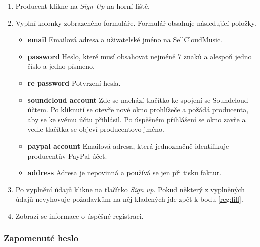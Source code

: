 \documentclass[12pt]{article}
\begin{document}
\begin{enumerate}

\item Producent klikne na \emph{Sign Up} na horní liště.
\item \label{reg:fill} Vyplní kolonky zobrazeného formuláře. Formulář obsahuje následující položky.

\begin{itemize}
\item{\textbf{email}} Emailová adresa a uživatelské jméno na SellCloudMusic.
\item{\textbf{password}} Heslo, které musí obsahovat nejméně 7 znaků a alespoň jedno číslo a jedno písmeno.
\item{\textbf{re password}} Potvrzení hesla.
\item{\textbf{soundcloud account}} Zde se nachází tlačítko ke spojení se Soundcloud účtem. Po kliknutí se otevře nové okno prohlížeče a požádá producenta, aby se ke svému účtu přihlásil. Po úspěšném přihlášení se okno zavře a vedle tlačítka se objeví producentovo jméno.
\item{\textbf{paypal account}} Emailová adresa, která jednoznačně identifikuje producentův PayPal účet.
\item{\textbf{address}} Adresa je nepovinná a používá se jen při tisku faktur.
\end{itemize}

\item Po vyplnění údajů klikne na tlačítko \emph{Sign up}. Pokud některý z vyplněných údajů nevyhovuje požadavkům na něj kladených jde zpět k bodu \ref{reg:fill}.
\item Zobrazí se informace o úspěšné registraci.

\end{enumerate}
\subsubsection{Zapomenuté heslo} \label{fpwd}
\end{document}
